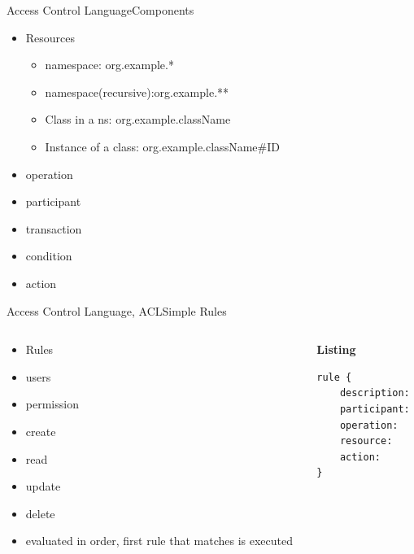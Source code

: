 \documentclass[pdf,table]{beamer}
\begin{document}
\begin{frame}{Access Control Language}{Components}
	\begin{itemize}
		\item Resources
		\begin{itemize}
			\item namespace: org.example.*
			\item namespace(recursive):org.example.** 
			\item Class in a ns: org.example.className 
			\item Instance of a class: org.example.className\#ID
		\end{itemize}
		\item operation
		\item participant
		\item transaction
		\item condition
		\item action
	\end{itemize}
\end{frame}

\begin{frame}[fragile]{Access Control Language, ACL}{Simple Rules}
	\begin{columns}[T]
		\begin{column}{0.48\textwidth}
			\begin{itemize}
				\item Rules
				\item users
				\item permission
				\item create
				\item read
				\item update
				\item delete
				\item evaluated in order, first rule that matches is executed
			\end{itemize}	
		\end{column}
		\begin{column}{0.48\textwidth}
			{\bf Listing}
			\begin{lstlisting}[language=ACL]
rule {
	description:
	participant:
	operation:
	resource:
	action:
}
			\end{lstlisting}
		\end{column}
	\end{columns}	
\end{frame}
\end{document}
